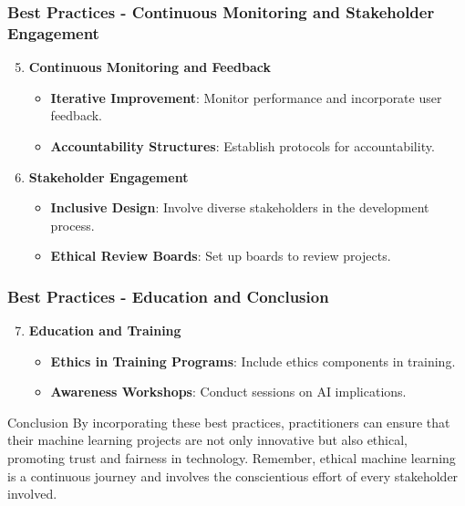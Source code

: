 \documentclass[aspectratio=169]{beamer}
\begin{document}
\begin{frame}[fragile]
    \frametitle{Best Practices - Continuous Monitoring and Stakeholder Engagement}
    \begin{enumerate}
        \setcounter{enumii}{4}  %
        \item \textbf{Continuous Monitoring and Feedback}
        \begin{itemize}
            \item \textbf{Iterative Improvement}: Monitor performance and incorporate user feedback.
            \item \textbf{Accountability Structures}: Establish protocols for accountability.
        \end{itemize}

        \item \textbf{Stakeholder Engagement}
        \begin{itemize}
            \item \textbf{Inclusive Design}: Involve diverse stakeholders in the development process.
            \item \textbf{Ethical Review Boards}: Set up boards to review projects.
        \end{itemize}
    \end{enumerate}
\end{frame}

\begin{frame}[fragile]
    \frametitle{Best Practices - Education and Conclusion}
    \begin{enumerate}
        \setcounter{enumii}{6}  %
        \item \textbf{Education and Training}
        \begin{itemize}
            \item \textbf{Ethics in Training Programs}: Include ethics components in training.
            \item \textbf{Awareness Workshops}: Conduct sessions on AI implications.
        \end{itemize}
    \end{enumerate}

    \begin{block}{Conclusion}
        By incorporating these best practices, practitioners can ensure that their machine learning projects are not only innovative but also ethical, promoting trust and fairness in technology. Remember, ethical machine learning is a continuous journey and involves the conscientious effort of every stakeholder involved.
    \end{block}
\end{frame}
\end{document}
